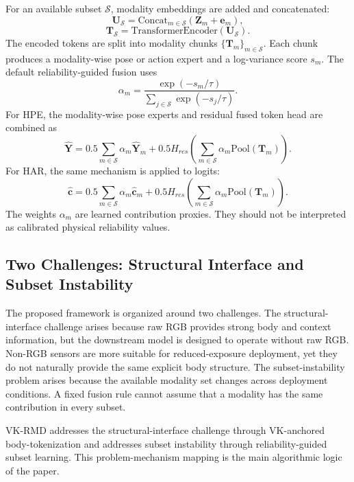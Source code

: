 ﻿\documentclass[journal]{IEEEtran}
\newcommand{\method}{VK-RMD}
\begin{document}
For an available subset $\mathcal{S}$, modality embeddings are added and concatenated:
\begin{equation}
    \mathbf{U}_{\mathcal{S}}=\mathrm{Concat}_{m\in\mathcal{S}}(\mathbf{Z}_{m}+\mathbf{e}_{m}),
\end{equation}
\begin{equation}
    \mathbf{T}_{\mathcal{S}}=\mathrm{TransformerEncoder}(\mathbf{U}_{\mathcal{S}}).
\end{equation}
The encoded tokens are split into modality chunks $\{\mathbf{T}_m\}_{m\in\mathcal{S}}$. Each chunk produces a modality-wise pose or action expert and a log-variance score $s_m$. The default reliability-guided fusion uses
\begin{equation}
    \alpha_m=\frac{\exp(-s_m/\tau)}{\sum_{j\in\mathcal{S}}\exp(-s_j/\tau)}.
\end{equation}
For HPE, the modality-wise pose experts and residual fused token head are combined as
\begin{equation}
    \hat{\mathbf{Y}}=0.5\sum_{m\in\mathcal{S}}\alpha_m\hat{\mathbf{Y}}_m+
    0.5H_{res}\left(\sum_{m\in\mathcal{S}}\alpha_m\mathrm{Pool}(\mathbf{T}_m)\right).
\end{equation}
For HAR, the same mechanism is applied to logits:
\begin{equation}
    \hat{\mathbf{c}}=0.5\sum_{m\in\mathcal{S}}\alpha_m\hat{\mathbf{c}}_m+
    0.5H_{res}\left(\sum_{m\in\mathcal{S}}\alpha_m\mathrm{Pool}(\mathbf{T}_m)\right).
\end{equation}
The weights $\alpha_m$ are learned contribution proxies. They should not be interpreted as calibrated physical reliability values.

\subsection{Two Challenges: Structural Interface and Subset Instability}
The proposed framework is organized around two challenges. The structural-interface challenge arises because raw RGB provides strong body and context information, but the downstream model is designed to operate without raw RGB. Non-RGB sensors are more suitable for reduced-exposure deployment, yet they do not naturally provide the same explicit body structure. The subset-instability problem arises because the available modality set changes across deployment conditions. A fixed fusion rule cannot assume that a modality has the same contribution in every subset.

\method{} addresses the structural-interface challenge through VK-anchored body-tokenization and addresses subset instability through reliability-guided subset learning. This problem-mechanism mapping is the main algorithmic logic of the paper.
\end{document}

